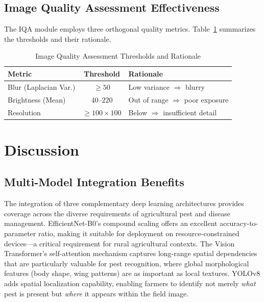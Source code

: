\documentclass[conference]{IEEEtran}
\begin{document}
\subsection{Image Quality Assessment Effectiveness}

The IQA module employs three orthogonal quality metrics. Table~\ref{tab:iqa_thresholds} summarizes the thresholds and their rationale.

\begin{table}[htbp]
\caption{Image Quality Assessment Thresholds and Rationale}
\label{tab:iqa_thresholds}
\centering
\renewcommand{\arraystretch}{1.15}
\begin{tabular}{@{}lcl@{}}
\toprule
\textbf{Metric} & \textbf{Threshold} & \textbf{Rationale} \\
\midrule
Blur (Laplacian Var.) & $\geq 50$ & Low variance $\Rightarrow$ blurry \\
Brightness (Mean)     & $40$--$220$ & Out of range $\Rightarrow$ poor exposure \\
Resolution            & $\geq 100 \times 100$ & Below $\Rightarrow$ insufficient detail \\
\bottomrule
\end{tabular}
\end{table}

\section{Discussion}

\subsection{Multi-Model Integration Benefits}
The integration of three complementary deep learning architectures provides coverage across the diverse requirements of agricultural pest and disease management. EfficientNet-B0's compound scaling offers an excellent accuracy-to-parameter ratio, making it suitable for deployment on resource-constrained devices—a critical requirement for rural agricultural contexts. The Vision Transformer's self-attention mechanism captures long-range spatial dependencies that are particularly valuable for pest recognition, where global morphological features (body shape, wing patterns) are as important as local textures. YOLOv8 adds spatial localization capability, enabling farmers to identify not merely \textit{what} pest is present but \textit{where} it appears within the field image.
\end{document}
